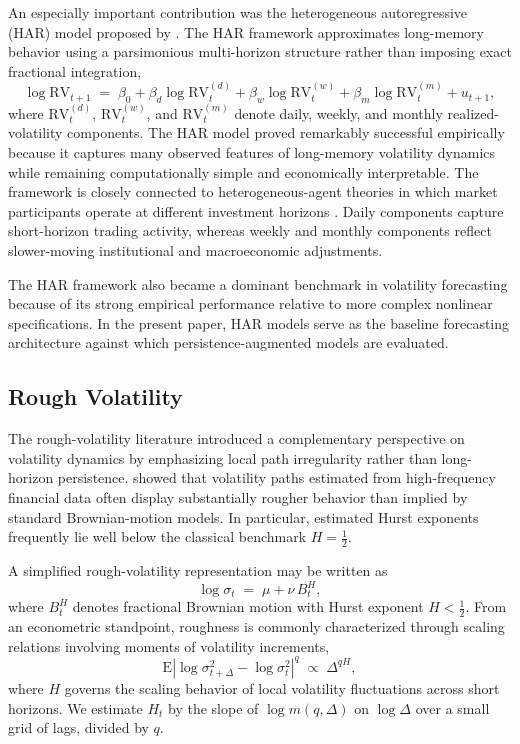 \documentclass[unnumsec,webpdf,contemporary,large]{oup-authoring-template}%
\theoremstyle{thmstyleone}%
\theoremstyle{thmstyletwo}%
\theoremstyle{thmstylethree}%
\begin{document}
An especially important contribution was the heterogeneous autoregressive
(HAR) model proposed by \citet{corsi2009simple}. The HAR framework
approximates long-memory behavior using a parsimonious multi-horizon
structure rather than imposing exact fractional integration,
\begin{equation}
  \log \mathrm{RV}_{t+1} \;=\; \beta_0 + \beta_d \log \mathrm{RV}^{(d)}_t
  + \beta_w \log \mathrm{RV}^{(w)}_t
  + \beta_m \log \mathrm{RV}^{(m)}_t
  + u_{t+1},
\end{equation}
where $\mathrm{RV}^{(d)}_t$, $\mathrm{RV}^{(w)}_t$, and
$\mathrm{RV}^{(m)}_t$ denote daily, weekly, and monthly realized-volatility
components. The HAR model proved remarkably successful empirically because
it captures many observed features of long-memory volatility dynamics while
remaining computationally simple and economically interpretable. The
framework is closely connected to heterogeneous-agent theories in which
market participants operate at different investment horizons
\citep{muller1997volatilities}. Daily components capture short-horizon
trading activity, whereas weekly and monthly components reflect
slower-moving institutional and macroeconomic adjustments.

The HAR framework also became a dominant benchmark in volatility forecasting
because of its strong empirical performance relative to more complex
nonlinear specifications. In the present paper, HAR models serve as the
baseline forecasting architecture against which persistence-augmented models
are evaluated.

\subsection{Rough Volatility}

The rough-volatility literature introduced a complementary perspective on
volatility dynamics by emphasizing local path irregularity rather than
long-horizon persistence. \citet{gatheral2018volatility} showed that
volatility paths estimated from high-frequency financial data often display
substantially rougher behavior than implied by standard Brownian-motion
models. In particular, estimated Hurst exponents frequently lie well below
the classical benchmark $H=\frac{1}{2}$.

A simplified rough-volatility representation may be written as
\begin{equation}
  \log \sigma_t \;=\; \mu + \nu\, B^H_t,
\end{equation}
where $B^H_t$ denotes fractional Brownian motion with Hurst exponent
$H<\frac{1}{2}$. From an econometric standpoint, roughness is commonly
characterized through scaling relations involving moments of volatility
increments,
\begin{equation}
  \mathrm{E}|\log\sigma^2_{t+\Delta} - \log\sigma^2_t|^q \;\propto\; \Delta^{qH},
\end{equation}
where $H$ governs the scaling behavior of local volatility fluctuations
across short horizons. We estimate $H_t$ by the slope of
$\log m(q,\Delta)$ on $\log\Delta$ over a small grid of lags, divided
by $q$.
\end{document}
